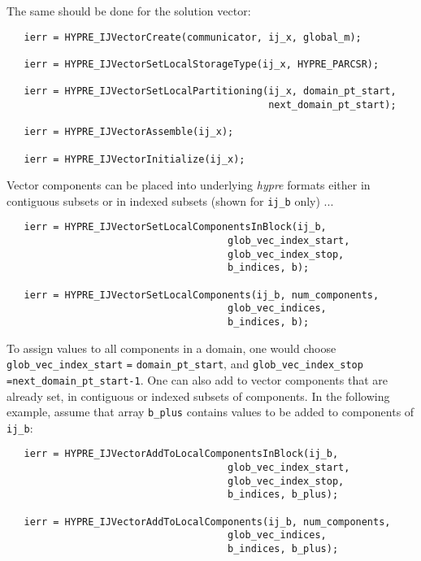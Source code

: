 \noindent The same should be done for the solution vector:

\begin{verbatim}
   ierr = HYPRE_IJVectorCreate(communicator, ij_x, global_m);

   ierr = HYPRE_IJVectorSetLocalStorageType(ij_x, HYPRE_PARCSR);

   ierr = HYPRE_IJVectorSetLocalPartitioning(ij_x, domain_pt_start,
                                             next_domain_pt_start);

   ierr = HYPRE_IJVectorAssemble(ij_x);

   ierr = HYPRE_IJVectorInitialize(ij_x);
\end{verbatim}

\noindent Vector components can be placed into underlying
{\slshape hypre} formats either in contiguous subsets or in
indexed subsets (shown for \verb+ij_b+ only) ...

\begin{verbatim}
   ierr = HYPRE_IJVectorSetLocalComponentsInBlock(ij_b,
                                      glob_vec_index_start,
                                      glob_vec_index_stop,
                                      b_indices, b);

   ierr = HYPRE_IJVectorSetLocalComponents(ij_b, num_components,
                                      glob_vec_indices,
                                      b_indices, b);
\end{verbatim}

\noindent To assign values to all components in a domain, one would
choose \verb+glob_vec_index_start+ \verb+=+ \verb+domain_pt_start+,
and 
\verb+glob_vec_index_stop+ \verb+=+\verb+next_domain_pt_start-1+.
One can also add to vector components that are already set, in
contiguous or indexed subsets of components.
In the following example,
assume that array \verb+b_plus+
contains values to be added to components of \verb+ij_b+:

\begin{verbatim}
   ierr = HYPRE_IJVectorAddToLocalComponentsInBlock(ij_b,
                                      glob_vec_index_start,
                                      glob_vec_index_stop,
                                      b_indices, b_plus); 

   ierr = HYPRE_IJVectorAddToLocalComponents(ij_b, num_components,
                                      glob_vec_indices,
                                      b_indices, b_plus);
\end{verbatim}

